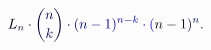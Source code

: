 \documentclass[12pt]{article}
\begin{document}
\makeatletter
\renewcommand*{\@textcolor}[3]{%
  \protect\leavevmode
  \begingroup
    \color#1{#2}#3%
  \endgroup
}
\makeatother
\begin{displaymath}
\mathcolor[RGB]{0,0,15}{L} _ { \mathcolor[RGB]{0,0,30}{n} } \mathcolor[RGB]{0,0,45}{\cdot} \mathcolor[RGB]{0,0,60}{\binom { \mathcolor[RGB]{0,0,75}{n} } { \mathcolor[RGB]{0,0,90}{k} } } \mathcolor[RGB]{0,0,105}{\cdot} \mathcolor[RGB]{0,0,120}{(} \mathcolor[RGB]{0,0,135}{n} \mathcolor[RGB]{0,0,150}{-} \mathcolor[RGB]{0,0,165}{1} \mathcolor[RGB]{0,0,180}{)} ^ { \mathcolor[RGB]{0,0,195}{n} \mathcolor[RGB]{0,0,210}{-} \mathcolor[RGB]{0,0,225}{k} } \mathcolor[RGB]{0,0,240}{\cdot} \mathcolor[RGB]{0,0,255}{(} \mathcolor[RGB]{0,15,0}{n} \mathcolor[RGB]{0,15,15}{-} \mathcolor[RGB]{0,15,30}{1} \mathcolor[RGB]{0,15,45}{)} ^ { \mathcolor[RGB]{0,15,60}{n} } \mathcolor[RGB]{0,15,75}{.}
\end{displaymath}
\end{document}
